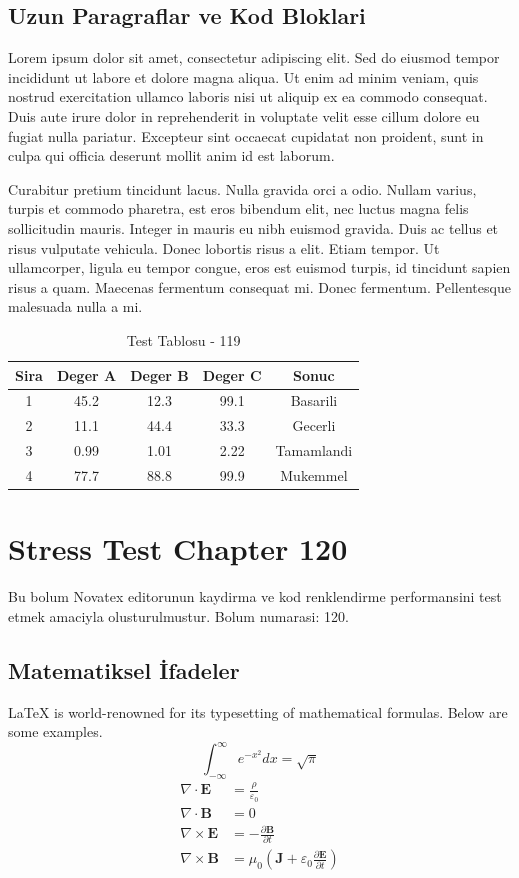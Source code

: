 \documentclass[12pt,a4paper]{article}
\begin{document}
\subsection{Uzun Paragraflar ve Kod Bloklari}
Lorem ipsum dolor sit amet, consectetur adipiscing elit. Sed do eiusmod tempor incididunt ut labore et dolore magna aliqua. Ut enim ad minim veniam, quis nostrud exercitation ullamco laboris nisi ut aliquip ex ea commodo consequat. Duis aute irure dolor in reprehenderit in voluptate velit esse cillum dolore eu fugiat nulla pariatur. Excepteur sint occaecat cupidatat non proident, sunt in culpa qui officia deserunt mollit anim id est laborum.

Curabitur pretium tincidunt lacus. Nulla gravida orci a odio. Nullam varius, turpis et commodo pharetra, est eros bibendum elit, nec luctus magna felis sollicitudin mauris. Integer in mauris eu nibh euismod gravida. Duis ac tellus et risus vulputate vehicula. Donec lobortis risus a elit. Etiam tempor. Ut ullamcorper, ligula eu tempor congue, eros est euismod turpis, id tincidunt sapien risus a quam. Maecenas fermentum consequat mi. Donec fermentum. Pellentesque malesuada nulla a mi.

\begin{table}[h!]
\centering
\begin{tabular}{|c|c|c|c|c|}
\hline
\textbf{Sira} & \textbf{Deger A} & \textbf{Deger B} & \textbf{Deger C} & \textbf{Sonuc} \\
\hline
1 & 45.2 & 12.3 & 99.1 & Basarili \\
2 & 11.1 & 44.4 & 33.3 & Gecerli \\
3 & 0.99 & 1.01 & 2.22 & Tamamlandi \\
4 & 77.7 & 88.8 & 99.9 & Mukemmel \\
\hline
\end{tabular}
\caption{Test Tablosu - 119}
\end{table}

\newpage
\section{Stress Test Chapter 120}
Bu bolum Novatex editorunun kaydirma ve kod renklendirme performansini test etmek amaciyla olusturulmustur. Bolum numarasi: 120.

\subsection{Matematiksel İfadeler}
\LaTeX{} is world-renowned for its typesetting of mathematical formulas. Below are some examples.
\begin{equation}
\int_{-\infty}^{\infty} e^{-x^2} dx = \sqrt{\pi}
\end{equation}
\begin{align}
\nabla \cdot \mathbf{E} &= \frac{\rho}{\varepsilon_0} \\
\nabla \cdot \mathbf{B} &= 0 \\
\nabla \times \mathbf{E} &= -\frac{\partial \mathbf{B}}{\partial t} \\
\nabla \times \mathbf{B} &= \mu_0\left(\mathbf{J} + \varepsilon_0 \frac{\partial \mathbf{E}}{\partial t}\right)
\end{align}
\end{document}
